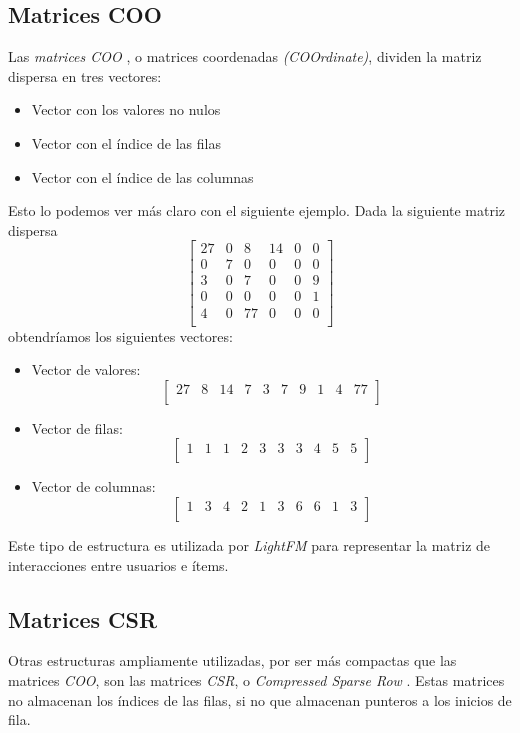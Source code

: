 \subsection{Matrices COO}\label{matrices-coo}
Las \textit{matrices COO} \cite{coo-matrix}, o matrices coordenadas \textit{(COOrdinate)}, dividen la matriz dispersa en tres vectores:
\begin{itemize}
\tightlist
\item Vector con los valores no nulos
\item Vector con el índice de las filas
\item Vector con el índice de las columnas
\end{itemize}
Esto lo podemos ver más claro con el siguiente ejemplo. Dada la siguiente matriz dispersa
\[\begin{bmatrix}
27&0&8&14&0&0\\
0&7&0&0&0&0\\
3&0&7&0&0&9\\
0&0&0&0&0&1\\
4&0&77&0&0&0\\
\end{bmatrix}\]
obtendríamos los siguientes vectores:
\begin{itemize}
\tightlist
\item Vector de valores: \[\begin{bmatrix} 27&8&14&7&3&7&9&1&4&77\\\end{bmatrix}\]
\item Vector de filas: \[\begin{bmatrix} 1&1&1&2&3&3&3&4&5&5\\\end{bmatrix}\]
\item Vector de columnas: \[\begin{bmatrix} 1&3&4&2&1&3&6&6&1&3\\
\end{bmatrix}\]
\end{itemize}

Este tipo de estructura es utilizada por \textit{LightFM} para representar la matriz de interacciones entre usuarios e ítems.

\subsection{Matrices CSR}\label{matrices-csr}
Otras estructuras ampliamente utilizadas, por ser más compactas que las matrices \textit{COO}, son las matrices \textit{CSR}, o \textit{Compressed Sparse Row} \cite{csr-matrix}. Estas matrices no almacenan los índices de las filas, si no que almacenan punteros a los inicios de fila.

